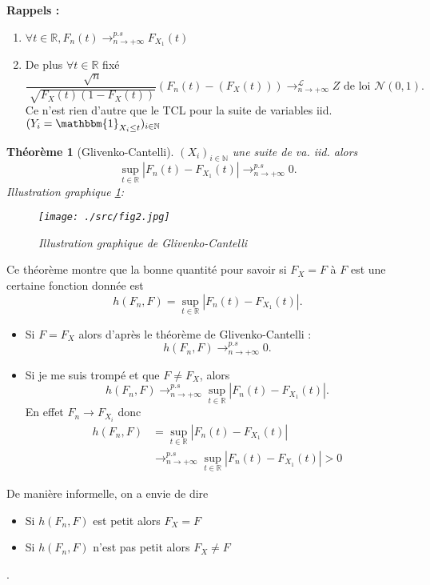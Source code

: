 \documentclass{article}
\theoremstyle{plain}%
\newtheorem{thm}{Théorème}[section]
\theoremstyle{definition}
\theoremstyle{remark}
\begin{document}
\textbf{Rappels : }
\begin{enumerate}
    \item $ \forall t \in \mathbb{R}, F_n(t) \to ^{p.s}_{n \to +\infty } F_{X_1}(t) $ 
    \item De plus $ \forall t \in \mathbb{R} $ fixé 
    \[
        \frac{\sqrt[]{n}}{\sqrt[]{F_X(t) (1 - F_X(t))}} (F_n(t) - (F_X(t))) \to ^\mathcal{L}_{n \to +\infty } Z \text{ de loi } \mathcal{N}(0,1)
        .\]
    Ce n'est rien d'autre que le TCL pour la suite de variables iid. $ (Y_i = \mathbbm{1}_{X_i \leq t})_{i \in \mathbb{N}} $ 
\end{enumerate}

\begin{thm}[Glivenko-Cantelli]
    $ (X_i)_{i \in \mathbb{N}} $ une suite de va. iid. alors 
    \[
        \sup_{t \in \mathbb{R}} \left| F_n(t) - F_{X_1}(t) \right| \to^{p.s}_{n \to + \infty } 0
    .\]
    Illustration graphique \ref{fig2}: 
    \begin{figure}[htbp]
        \centering
        \texttt{[image: ./src/fig2.jpg]}
        \caption{Illustration graphique de Glivenko-Cantelli}
        \label{fig2}
    \end{figure}
\end{thm}

Ce théorème montre que la bonne quantité pour savoir si $ F_X = F $ à $ F $ est une certaine fonction donnée est
\[
    h(F_n, F) = \sup_{t \in \mathbb{R}} \left| F_n(t) - F_{X_1}(t) \right|
.\]
\begin{itemize}
    \item Si $ F=F_X $ alors d'après le théorème de Glivenko-Cantelli :
    \[
        h(F_n, F) \to^{p.s}_{n \to + \infty } 0
    .\]
    \item Si je me suis trompé et que $ F \neq F_X $, alors 
    \[
        h(F_n, F) \to^{p.s}_{n \to + \infty } \sup_{t \in \mathbb{R}} \left| F_n(t) - F_{X_1}(t) \right|
    .\]
    En effet $ F_n \to F_{X_i} $ donc \begin{align*}
        h(F_n, F) &= \sup_{t \in \mathbb{R}} \left| F_n(t) - F_{X_1}(t) \right| \\
                    & \to^{p.s}_{n \to + \infty } \sup_{t \in \mathbb{R}} \left| F_n(t) - F_{X_1}(t) \right| > 0
    \end{align*}
\end{itemize}
De manière informelle, on a envie de dire \begin{itemize}
    \item Si $ h(F_n, F) $ est petit alors $ F_X = F $ 
    \item Si $ h(F_n, F) $ n'est pas petit alors $ F_X \neq F $ 
\end{itemize}. \\
\end{document}
